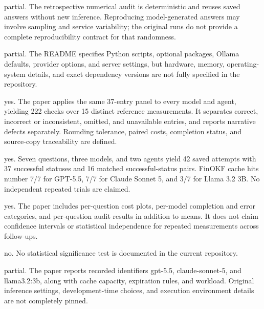 \documentclass[letterpaper]{article}
\begin{document}
\begin{itemize}
\begin{itemize}
	partial. The retrospective numerical audit is deterministic and reuses saved answers without new inference. Reproducing model-generated answers may involve sampling and service variability; the original runs do not provide a complete reproducibility contract for that randomness.

	partial. The README specifies Python scripts, optional packages, Ollama defaults, provider options, and server settings, but hardware, memory, operating-system details, and exact dependency versions are not fully specified in the repository.

	yes. The paper applies the same 37-entry panel to every model and agent, yielding 222 checks over 15 distinct reference measurements. It separates correct, incorrect or inconsistent, omitted, and unavailable entries, and reports narrative defects separately. Rounding tolerance, paired costs, completion status, and source-copy traceability are defined.

	yes. Seven questions, three models, and two agents yield 42 saved attempts with 37 successful statuses and 16 matched successful-status pairs. FinOKF cache hits number 7/7 for GPT-5.5, 7/7 for Claude Sonnet 5, and 3/7 for Llama 3.2 3B. No independent repeated trials are claimed.

	yes. The paper includes per-question cost plots, per-model completion and error categories, and per-question audit results in addition to means. It does not claim confidence intervals or statistical independence for repeated measurements across follow-ups.

	no. No statistical significance test is documented in the current repository.

	partial. The paper reports recorded identifiers gpt-5.5, claude-sonnet-5, and llama3.2:3b, along with cache capacity, expiration rules, and workload. Original inference settings, development-time choices, and execution environment details are not completely pinned.


\end{itemize}
\end{itemize}
\ifreproStandalone
\end{document}
